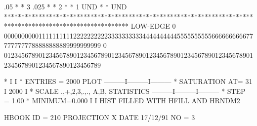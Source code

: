 \begin{Listing}
      .05   *                                                                                                          *   3
      .025  *                                                                                                          *   2
            *                                                                                                          *   1
   UND      *                                                                                                          * UND
            ************************************************************************************************************
 LOW-EDGE   0   0000000000111111111122222222223333333333444444444455555555556666666666777777777788888888889999999999
            0   0123456789012345678901234567890123456789012345678901234567890123456789012345678901234567890123456789
 
  *                                                          I         I
  * ENTRIES =     2000                   PLOT       ---------I---------I---------
  * SATURATION  AT=           31                             I 2000    I
  * SCALE  .,+,2,3,.,., A,B,           STATISTICS   ---------I---------I---------
  * STEP = 1.00     * MINIMUM=0.000                          I         I
\finalnewpage 
 HIST FILLED WITH HFILL AND HRNDM2                                               
 
 HBOOK     ID =       210             PROJECTION X               DATE  17/12/91              NO =   3
 

\end{Listing}
